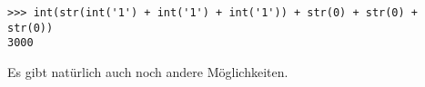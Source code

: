 \begin{lstlisting}
>>> int(str(int('1') + int('1') + int('1')) + str(0) + str(0) + str(0))
3000
\end{lstlisting}
Es gibt natürlich auch noch andere Möglichkeiten.
